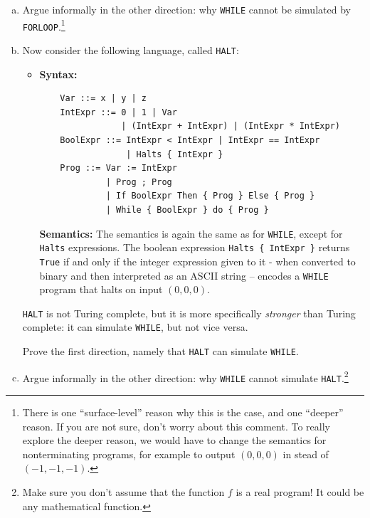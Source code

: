 \documentclass{article}
\theoremstyle{plain}
\begin{document}
\begin{enumerate}
\begin{enumerate}[(a)]
\texttt{FORLOOP} is not Turing complete,
but it is more specifically \emph{weaker} than Turing complete:
it can be simulated by \texttt{WHILE} programs, but not vice versa.

Prove the first direction, that \texttt{FORLOOP} can be simulated by \texttt{WHILE}.

\item
Argue informally in the other direction: why \texttt{WHILE} cannot be simulated by \texttt{FORLOOP}.\footnote{
    There is one ``surface-level'' reason why this is the case,
    and one ``deeper'' reason.
    If you are not sure, don't worry about this comment.
    To really explore the deeper reason, we would have to change the semantics for nonterminating programs, for example to output $(0, 0, 0)$ in stead of $(-1, -1, -1)$.
}

\item
Now consider the following language, called \texttt{HALT}:

\begin{itemize}
\item \textbf{Syntax:}
\begin{verbatim}
    Var ::= x | y | z
    IntExpr ::= 0 | 1 | Var
                | (IntExpr + IntExpr) | (IntExpr * IntExpr)
    BoolExpr ::= IntExpr < IntExpr | IntExpr == IntExpr
                 | Halts { IntExpr }
    Prog ::= Var := IntExpr
             | Prog ; Prog
             | If BoolExpr Then { Prog } Else { Prog }
             | While { BoolExpr } do { Prog }
\end{verbatim}

\textbf{Semantics:}
The semantics is again the same as for \texttt{WHILE},
except for \texttt{Halts} expressions.
The boolean expression \texttt{Halts \{ IntExpr \}} returns \texttt{True} if and only if the integer expression given to it - when converted to binary and then interpreted as an ASCII string -- encodes a \texttt{WHILE} program that halts on input $(0, 0, 0)$.

\end{itemize}

\texttt{HALT} is not Turing complete,
but it is more specifically \emph{stronger} than Turing complete:
it can simulate \texttt{WHILE}, but not vice versa.

Prove the first direction, namely that \texttt{HALT} can simulate \texttt{WHILE}.

\item
Argue informally in the other direction: why \texttt{WHILE} cannot simulate \texttt{HALT}.\footnote{
    Make sure you don't assume that the function $f$ is a real program! It could be any mathematical function.
}


\end{enumerate}
\end{enumerate}
\end{document}
